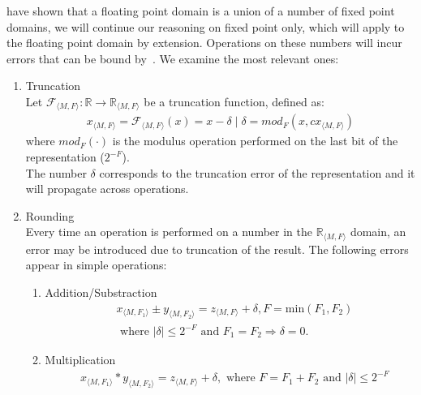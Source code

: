 \documentclass[sigconf]{llncs}
\newcommand{\jrronly}[1]{{}}
\begin{document}
have shown that a floating point domain is a union of a number of fixed
point domains, we will continue our reasoning on fixed point only, which
will apply to the floating point domain by extension.  Operations on these
numbers will incur errors that can be bound
by~\cite{DBLP:conf/arith/BrainTRW15}.  We examine the most relevant ones:
%
\begin{enumerate}
\item Truncation\\
Let $\mathcal{F}_{\langle M,F \rangle} : \mathbb{R} \rightarrow \mathbb{R}_{\langle M,F \rangle}$
be a truncation function, defined as:
\begin{align*}
x_{\langle M,F \rangle}=\mathcal{F}_{\langle M,F \rangle}(x) = x-\delta \mid \delta=mod_F(x,c x_{\langle M,F \rangle})
\end{align*} 
where $mod_F(\cdot)$ is the modulus operation performed on the last bit of the representation ($2^{-F}$).\\
The number $\delta$ corresponds to the truncation error of the representation and it will propagate across operations.
\jrronly{
%
It is worth mentioning that not all systems truncate equally.  In the
definition above $\delta$ may be positive or negative, and even this
decision can be made dependent on the sign of $x$.  Common cases in computer
systems are: round downwards (\emph{ie} to $-\infty$), round upwards
(\emph{ie} to $+\infty$), and round to zero.  Rounding errors are cumulative
which means the overall error will statistically increase with every
operation, thus algorithms performing fewer operations can be more precise
in this respect than iterative ones.
%
}
\item Rounding\\
Every time an operation is performed on a number in the $\mathbb{R}_{\langle M,F \rangle}$ domain, an error may be
introduced due to truncation of the result. 
The following errors appear in simple operations:
\begin{enumerate}
\item Addition/Substraction
\begin{align*}
&x_{\langle M,F_1\rangle} \pm y_{\langle M,F_2\rangle}=z_{\langle M,F\rangle} + \delta,  F=\text{min}(F_1,F_2)\\
&\text{ where } |\delta| \leq 2^{-F} \text{ and } F_1=F_2 \Rightarrow \delta=0.
\end{align*}
\item Multiplication
\begin{align*}
&x_{\langle M,F_1\rangle} * y_{\langle M,F_2\rangle}=z_{\langle M,F\rangle} + \delta, \text{ where } F=F_1+F_2 \text{ and } |\delta| \leq 2^{-F}

\end{align*}
\end{enumerate}
\end{enumerate}
\end{document}
